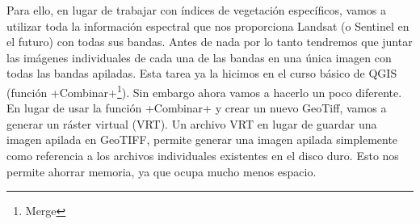 \documentclass[a4paper,11pt]{article}
\begin{document}
      Para ello, en lugar de trabajar con índices de vegetación específicos, vamos a utilizar toda la información espectral que nos proporciona Landsat (o Sentinel en el futuro) con todas sus bandas. Antes de nada por lo tanto tendremos que juntar las imágenes individuales de cada una de las bandas en una única imagen con todas las bandas apiladas. Esta tarea ya la hicimos en el curso básico de QGIS (función \cverb+Combinar+\footnote{Merge}). Sin embargo ahora vamos a hacerlo un poco diferente. En lugar de usar la función \cverb+Combinar+ y crear un nuevo GeoTiff, vamos a generar un ráster virtual (VRT). Un archivo VRT en lugar de guardar una imagen apilada en GeoTIFF, permite generar una imagen apilada simplemente como referencia a los archivos individuales existentes en el disco duro. Esto nos permite ahorrar memoria, ya que ocupa mucho menos espacio.
      
\end{document}
